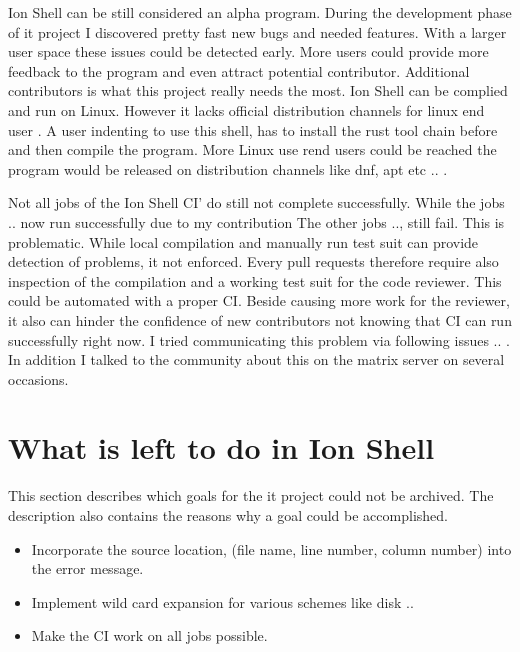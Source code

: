 \itemIonShellDistribution

Ion Shell can be still considered an alpha program.
During the development phase of it project I discovered pretty fast new bugs and needed features.
With a larger user space these issues could be detected early.
More users could provide more feedback to the program and even attract potential contributor.
Additional contributors is what this project really needs the most.
Ion Shell can be complied and run on Linux.
However it lacks official distribution channels for linux end user .
A user indenting to use this shell, has to install the rust tool chain before and then compile the program.
More Linux use rend users could be reached the program would be released on distribution channels like dnf, apt etc .. .

\itemIonShellCI

Not all jobs of the Ion Shell CI' do still not complete successfully.
While the jobs .. now run successfully due to my contribution
The other jobs .., still fail.
This is problematic. While local compilation and manually run test suit can provide detection of problems, it not enforced.
Every pull requests therefore require also inspection of the compilation and a working test suit for the code reviewer.
This could be automated with a proper CI.
Beside causing more work for the reviewer, it also can hinder the confidence of new contributors not knowing that CI can run successfully right now.
I tried communicating this problem via following issues .. .
In addition I talked to the community about this on the matrix server on several occasions.

\section{What is left to do in Ion Shell}

This section describes which goals for the it project could not be archived.
The description also contains the reasons why a goal could be accomplished.

\begin{itemize}
	\item Incorporate the source location, (file name, line number, column number) into the error message.
	\item Implement wild card expansion for various schemes like disk ..
	\item Make the CI work on all jobs possible.
\end{itemize}

